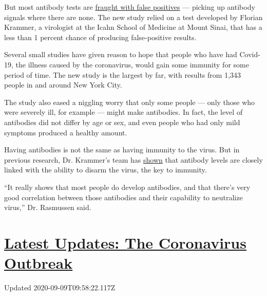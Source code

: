 But most antibody tests are
\href{https://www.nytimes3xbfgragh.onion/2020/04/24/health/coronavirus-antibody-tests.html}{fraught
with false positives} --- picking up antibody signals where there are
none. The new study relied on a test developed by Florian Krammer, a
virologist at the Icahn School of Medicine at Mount Sinai, that has a
less than 1 percent chance of producing false-positive results.

Several small studies have given reason to hope that people who have had
Covid-19, the illness caused by the coronavirus, would gain some
immunity for some period of time. The new study is the largest by far,
with results from 1,343 people in and around New York City.

The study also eased a niggling worry that only some people --- only
those who were severely ill, for example --- might make antibodies. In
fact, the level of antibodies did not differ by age or sex, and even
people who had only mild symptoms produced a healthy amount.

Having antibodies is not the same as having immunity to the virus. But
in previous research, Dr. Krammer's team has
\href{https://www.medrxiv.org/content/10.1101/2020.03.17.20037713v2}{shown}
that antibody levels are closely linked with the ability to disarm the
virus, the key to immunity.

``It really shows that most people do develop antibodies, and that
there's very good correlation between those antibodies and their
capability to neutralize virus,'' Dr. Rasmussen said.

\hypertarget{latest-updates-the-coronavirus-outbreak}{%
\section{\texorpdfstring{\href{https://www.nytimes3xbfgragh.onion/2020/09/09/world/covid-19-coronavirus.html?action=click\&pgtype=Article\&state=default\&region=MAIN_CONTENT_1\&context=storylines_live_updates}{Latest
Updates: The Coronavirus
Outbreak}}{Latest Updates: The Coronavirus Outbreak}}\label{latest-updates-the-coronavirus-outbreak}}

Updated 2020-09-09T09:58:22.117Z


